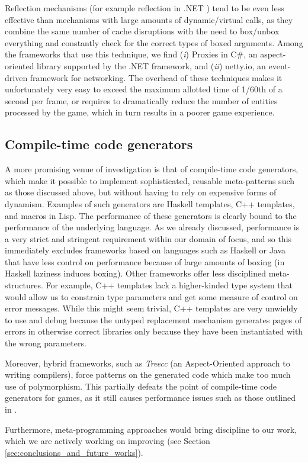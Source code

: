 Reflection mechanisms (for example reflection in .NET \cite{richter2012clr}) tend to be even less effective than mechanisms with large amounts of dynamic/virtual calls, as they combine the same number of cache disruptions with the need to box/unbox everything and constantly check for the correct types of boxed arguments. Among the frameworks that use this technique, we find (\textit{i}) Proxies in C\#, an aspect-oriented library supported by the .NET framework, and (\textit{ii}) netty.io, an event-driven framework for networking. The overhead of these techniques makes it unfortunately very easy to exceed the maximum allotted time of 1/60th of a second per frame, or requires to dramatically reduce the number of entities processed by the game, which in turn results in a poorer game experience.


\subsection{Compile-time code generators}

A more promising venue of investigation is that of compile-time code generators, which make it possible to implement sophisticated, reusable meta-patterns such as those discussed above, but without having to rely on expensive forms of dynamism. Examples of such generators are Haskell templates, C++ templates, and macros in Lisp. The performance of these generators is clearly bound to the performance of the underlying language. As we already discussed, performance is a very strict and stringent requirement within our domain of focus, and so this immediately excludes frameworks based on languages such as Haskell or Java that have less control on performance because of large amounts of boxing (in Haskell laziness induces boxing). Other frameworks offer less disciplined meta-structures. For example, C++ templates lack a higher-kinded type system that would allow us to constrain type parameters and get some measure of control on error messages. While this might seem trivial, C++ templates are very unwieldy to use and debug because the untyped replacement mechanism generates pages of errors in otherwise correct libraries only because they have been instantiated with the wrong parameters.

Moreover, hybrid frameworks, such as \textit{Treecc} (an Aspect-Oriented approach to writing compilers), force patterns on the generated code which make too much use of polymorphism. This partially defeats the point of compile-time code generators for games, as it still causes performance issues such as those outlined in \cite{ungar1992object}.

Furthermore, meta-programming approaches would bring discipline to our work, which we are actively working on improving (see Section \ref{sec:conclusions_and_future_works}).